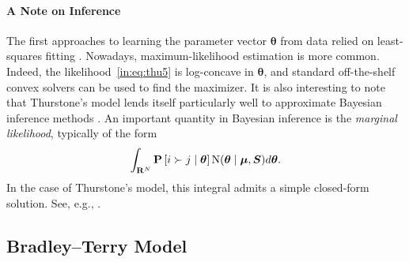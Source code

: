 \paragraph{A Note on Inference}
The first approaches to learning the parameter vector $\bm{\theta}$ from data relied on least-squares fitting \citep{thurstone1927method, mosteller1951remarks}.
Nowadays, maximum-likelihood estimation is more common.
Indeed, the likelihood~\eqref{in:eq:thu5} is log-concave in $\bm{\theta}$, and standard off-the-shelf convex solvers can be used to find the maximizer.
It is also interesting to note that Thurstone's model lends itself particularly well to approximate Bayesian inference methods \citep{chu2005extensions, chu2005preference}.
An important quantity in Bayesian inference is the \emph{marginal likelihood}, typically of the form
\begin{align*}
\int_{\mathbf{R}^N} \mathbf{P}\left[ i \succ j \mid \bm{\theta} \right] \mathrm{N}( \bm{\theta} \mid \bm{\mu}, \bm{S} ) d\bm{\theta}.
\end{align*}
In the case of Thurstone's model, this integral admits a simple closed-form solution. See, e.g., \citet[Section~3.9]{rasmussen2006gaussian}.


\subsection{Bradley--Terry Model}
\label{in:sec:btmodel}

